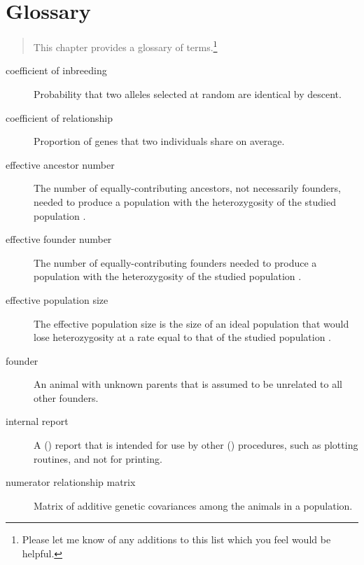 \chapter{Glossary}
\label{cha:glossary}
\begin{quote}
This chapter provides a glossary of terms.\footnote{Please let me know of any additions to this list which
you feel would be helpful.}
\end{quote}
\begin{description}
\item[coefficient of inbreeding] Probability that two alleles selected at random are identical by descent.
\end{description}
\begin{description}
\item[coefficient of relationship] Proportion of genes that two individuals share on average.
\end{description}
\begin{description}
\item[effective ancestor number] The number of equally-contributing ancestors, not necessarily founders, needed to produce a population with the heterozygosity of the studied population \cite{ref352}.
\end{description}
\begin{description}
\item[effective founder number] The number of equally-contributing founders needed to produce a population with the heterozygosity of the studied population \cite{ref640}.
\end{description}
\begin{description}
\item[effective population size] The effective population size is the size of an ideal population that would lose heterozygosity at a rate equal to that of the studied population \cite{ref91}.
\end{description}
\begin{description}
\item[founder] An animal with unknown parents that is assumed to be unrelated to all other founders.
\end{description}
\begin{description}
\item[internal report] A \PyPedal() report that is intended for use by other \PyPedal() procedures, such as plotting
routines, and not for printing.
\end{description}
\begin{description}
\item[numerator relationship matrix] Matrix of additive genetic covariances among the animals in a population.
\end{description}
